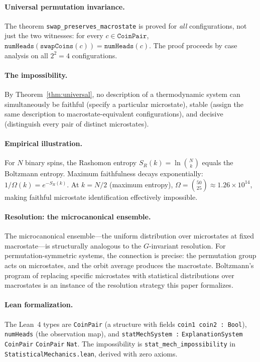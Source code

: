 \paragraph{Universal permutation invariance.}
The theorem \texttt{swap\_preserves\_macrostate} is proved for \emph{all}
configurations, not just the two witnesses: for every $c \in \texttt{CoinPair}$,
$\texttt{numHeads}(\texttt{swapCoins}(c)) = \texttt{numHeads}(c)$.  The proof
proceeds by case analysis on all $2^2 = 4$ configurations.

\paragraph{The impossibility.}
By Theorem~\ref{thm:universal}, no description of a thermodynamic system can
simultaneously be faithful (specify a particular microstate), stable (assign the
same description to macrostate-equivalent configurations), and decisive
(distinguish every pair of distinct microstates).

\paragraph{Empirical illustration.}
For $N$ binary spins, the Rashomon entropy $S_R(k) = \ln \binom{N}{k}$ equals
the Boltzmann entropy.  Maximum faithfulness decays exponentially:
$1/\Omega(k) = e^{-S_R(k)}$.  At $k = N/2$ (maximum entropy),
$\Omega = \binom{50}{25} \approx 1.26 \times 10^{14}$, making faithful
microstate identification effectively impossible.

\paragraph{Resolution: the microcanonical ensemble.}
The microcanonical ensemble---the uniform distribution over microstates at fixed
macrostate---is structurally analogous to the $G$-invariant resolution.  For
permutation-symmetric systems, the connection is precise: the permutation group
acts on microstates, and the orbit average produces the macrostate.  Boltzmann's
program of replacing specific microstates with statistical distributions over
macrostates is an instance of the resolution strategy this paper formalizes.

\paragraph{Lean formalization.}
The Lean~4 types are \texttt{CoinPair} (a structure with fields
\texttt{coin1 coin2 : Bool}), \texttt{numHeads} (the observation map),
and \texttt{statMechSystem\,:} \texttt{ExplanationSystem} \texttt{CoinPair} \texttt{CoinPair} \texttt{Nat}.
The impossibility is \texttt{stat\_mech\_impossibility} in
\texttt{StatisticalMechanics.lean}, derived with zero axioms.
